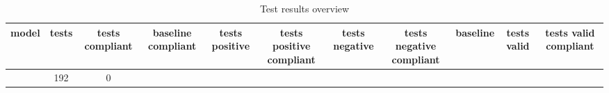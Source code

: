 
  \begin{table}[h!]
  \centering
  \begin{tabular}{|c|c|c|c|c|c|c|c|c|c|c|}
  \hline
  model & tests & tests compliant & baseline compliant & tests positive & tests positive compliant & tests negative & tests negative compliant & baseline & tests valid & tests valid compliant \\
  \hline
   & 192 & 0%
  \end{tabular}
  \caption{Test results overview}
  
  \end{table}
  